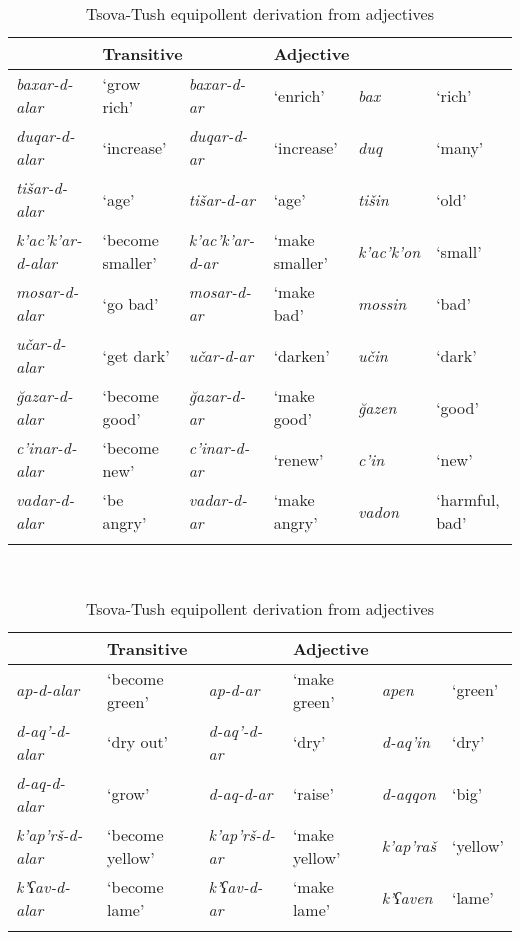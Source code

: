 \begin{table}
	\footnotesize
	\begin{subtable}{\textwidth}
	\caption{}
	\begin{tabular}{ *3{l@{~}l} }
        \lsptoprule
		\multicolumn{2}{l}{Intransitive} & \multicolumn{2}{l}{Transitive} & \multicolumn{2}{l}{Adjective} \\
		\midrule
		\textit{baxar-d-alar} & `grow rich' & \textit{baxar-d-ar} & `enrich' & \textit{bax} & `rich' \\
		\textit{duqar-d-alar} & `increase' & \textit{duqar-d-ar} & `increase' & \textit{duq} & `many' \\
		\textit{tišar-d-alar} & `age' & \textit{tišar-d-ar} & `age'  & \textit{tišin} & `old' \\
		\textit{k'ac'k'ar-d-alar} & `become smaller' & \textit{k'ac'k'ar-d-ar} & `make smaller' & \textit{k'ac'k'on} & `small' \\
		\textit{mosar-d-alar} & `go bad' & \textit{mosar-d-ar} & `make bad' & \textit{mossin} & `bad' \\
		\textit{učar-d-alar} & `get dark' &\textit{učar-d-ar} & `darken' & \textit{učin} & `dark' \\
		\textit{\u{g}azar-d-alar} & `become good' &\textit{\u{g}azar-d-ar} & `make good' & \textit{\u{g}azen} & `good' \\
		\textit{c'inar-d-alar} & `become new' & \textit{c'inar-d-ar} & `renew' & \textit{c'in} & `new' \\
		\textit{vadar-d-alar} & `be angry' & \textit{vadar-d-ar} & `make angry' &  \textit{vadon} & `harmful, bad'\\
		\lspbottomrule
	\end{tabular}
	\end{subtable}\medskip\\
	\begin{subtable}{\textwidth}
	\centering
	\caption{}
	\begin{tabular}{ *3{l@{~}l} }
		\lsptoprule
		\multicolumn{2}{l}{Intransitive} & \multicolumn{2}{l}{Transitive} & \multicolumn{2}{l}{Adjective} \\
		\midrule
		\textit{ap-d-alar} & `become green' & \textit{ap-d-ar} & `make green' & \textit{apen} & `green' \\
		\textit{d-aq'-d-alar} & `dry out' & \textit{d-aq'-d-ar} & `dry' & \textit{d-aq'in} & `dry' \\
		\textit{d-aq-d-alar} & `grow' & \textit{d-aq-d-ar} & `raise' & \textit{d-aqqon} & `big' \\
		\textit{k'ap'rš-d-alar} & `become yellow' & \textit{k'ap'rš-d-ar} & `make yellow' & \textit{k'ap'raš} & `yellow' \\
		\textit{k'ʕav-d-alar} & `become lame' & \textit{k'ʕav-d-ar} & `make lame' & \textit{k'ʕaven} & `lame' \\
		\lspbottomrule
	\end{tabular}
	\end{subtable}
	\caption{Tsova-Tush equipollent derivation from adjectives}
	\label{verbderiv-table4}
\end{table}


